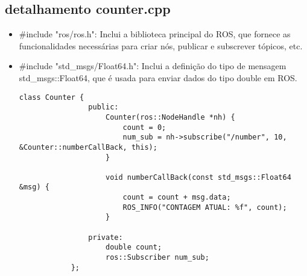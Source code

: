 \documentclass[letterpaper]{article}
\begin{document}
    \subsection{detalhamento counter.cpp}
        \begin{itemize}
            \item \#include "ros/ros.h": Inclui a biblioteca principal do ROS, que fornece as funcionalidades necessárias para criar nós, publicar e subscrever tópicos, etc.
            \item \#include "std\_msgs/Float64.h": Inclui a definição do tipo de mensagem std\_msgs::Float64, que é usada para enviar dados do tipo double em ROS.
            \begin{lstlisting}[style=cppStyle, title= declaração da classe counter ]
            class Counter {
                public:
                    Counter(ros::NodeHandle *nh) {
                        count = 0;
                        num_sub = nh->subscribe("/number", 10, &Counter::numberCallBack, this);
                    }
            
                    void numberCallBack(const std_msgs::Float64 &msg) {
                        count = count + msg.data;
                        ROS_INFO("CONTAGEM ATUAL: %f", count);
                    }
            
                private:
                    double count;
                    ros::Subscriber num_sub;
            };
        

\end{lstlisting}
\end{itemize}
\end{document}
